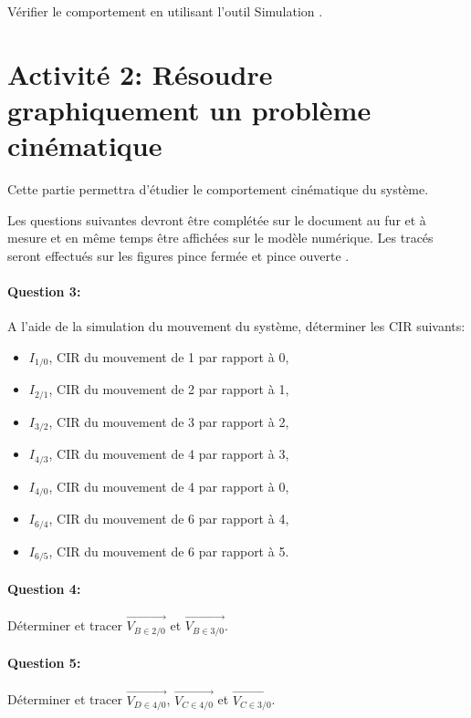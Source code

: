 \reponse[1]

Vérifier le comportement en utilisant l'outil \og Simulation \fg.


\section{Activité 2: Résoudre graphiquement un problème cinématique}

Cette partie permettra d'étudier le comportement cinématique du système.

Les questions suivantes devront être complétée sur le document au fur et à mesure et en même temps être affichées sur le modèle numérique. Les tracés seront effectués sur les figures \og pince fermée \fg et \og pince ouverte \fg.

\paragraph{Question 3:} A l'aide de la simulation du mouvement du système, déterminer les CIR suivants:
\begin{itemize}
 \item $I_{1/0}$, CIR du mouvement de 1 par rapport à 0,
 \item $I_{2/1}$, CIR du mouvement de 2 par rapport à 1,
 \item $I_{3/2}$, CIR du mouvement de 3 par rapport à 2,
 \item $I_{4/3}$, CIR du mouvement de 4 par rapport à 3,
 \item $I_{4/0}$, CIR du mouvement de 4 par rapport à 0,
 \item $I_{6/4}$, CIR du mouvement de 6 par rapport à 4,
 \item $I_{6/5}$, CIR du mouvement de 6 par rapport à 5.
\end{itemize}

\paragraph{Question 4:} Déterminer et tracer $\overrightarrow{V_{B\in 2/0}}$ et $\overrightarrow{V_{B\in 3/0}}$.

\reponse[1]

\paragraph{Question 5:} Déterminer et tracer $\overrightarrow{V_{D\in 4/0}}$, $\overrightarrow{V_{C\in 4/0}}$ et $\overrightarrow{V_{C\in 3/0}}$.

